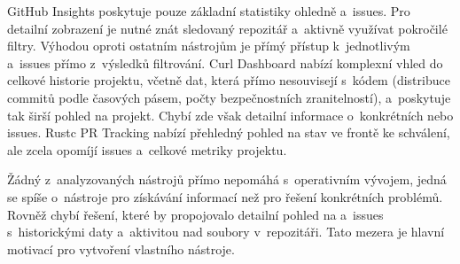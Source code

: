 GitHub Insights poskytuje pouze základní statistiky ohledně \PR a~issues. Pro detailní zobrazení je nutné znát sledovaný repozitář a~aktivně využívat pokročilé filtry. Výhodou oproti ostatním nástrojům je přímý přístup k~jednotlivým \PR a~issues přímo z~výsledků filtrování. Curl Dashboard nabízí komplexní vhled do celkové historie projektu, včetně dat, která přímo nesouvisejí s~kódem (distribuce commitů podle časových pásem, počty bezpečnostních zranitelností), a~poskytuje tak širší pohled na projekt. Chybí zde však detailní informace o~konkrétních \PR nebo issues. Rustc PR Tracking nabízí přehledný pohled na stav \PR ve frontě ke schválení, ale zcela opomíjí issues a~celkové metriky projektu.

Žádný z~analyzovaných nástrojů přímo nepomáhá s~operativním vývojem, jedná se spíše o~nástroje pro získávání informací než pro řešení konkrétních problémů. Rovněž chybí řešení, které by propojovalo detailní pohled na \PR a~issues s~historickými daty a~aktivitou nad soubory v~repozitáři. Tato mezera je hlavní motivací pro vytvoření vlastního nástroje.
